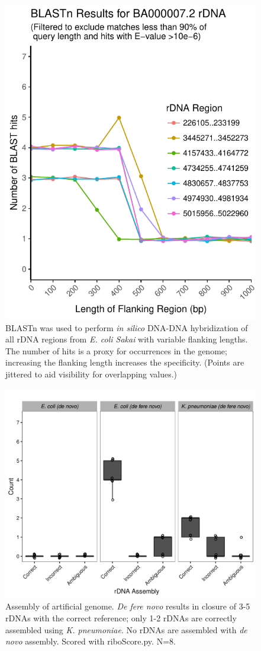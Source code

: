 \documentclass[10pt]{article}
\begin{document}
\begin{figure}[H]
    \centering
    \hspace*{0cm}\includegraphics[width=.5\textwidth]{grouped_sakai_BLAST_results}
    \caption{BLASTn was used to perform \textit{in silico} DNA-DNA hybridization of all rDNA regions from \textit{E. coli Sakai} with variable flanking lengths. The number of hits is a proxy for occurrences in the genome; increasing the flanking length increases the specificity. (Points are jittered to aid visibility for overlapping values.)}
    \label{fig:blast}
  \end{figure}

\begin{figure}[H]
    \centering
    \hspace*{0cm}\includegraphics[width=.60\textwidth]{simulated_genome}
    \caption{Assembly of artificial genome. \textit{De fere novo} results in closure of 3-5 rDNAs with the correct reference; only 1-2 rDNAs are correctly assembled using \textit{K. pneumoniae}.  No rDNAs are assembled with \textit{de novo} assembly. Scored with riboScore.py. N=8.}
    \label{fig:simgenome}
\end{figure}
\end{document}

